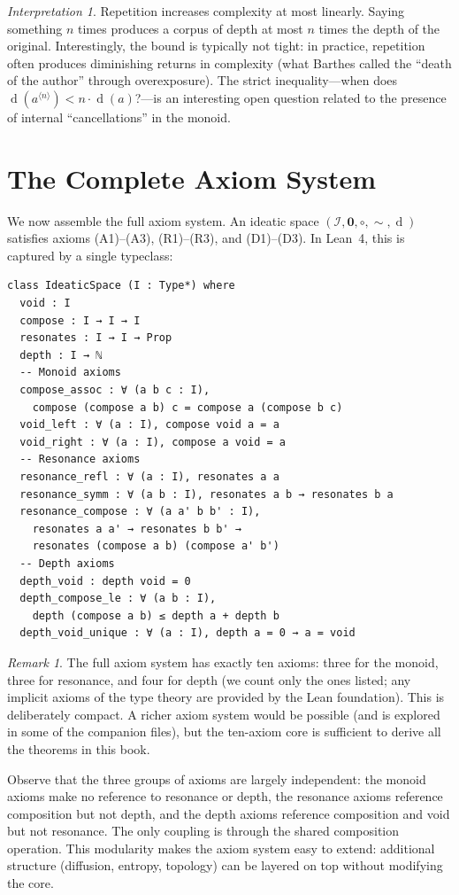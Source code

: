 \documentclass[11pt,openany]{book}
\theoremstyle{definition}
\theoremstyle{plain}
\theoremstyle{remark}
\newtheorem{remark}[axiom]{Remark}
\newtheorem{interpretation}[axiom]{Interpretation}
\newcommand{\IS}{\mathcal{I}}               %
\newcommand{\compose}{\circ}                 %
\newcommand{\void}{\mathbf{0}}              %
\newcommand{\res}{\sim}                      %
\newcommand{\depth}{\operatorname{d}}       %
\newcommand{\compN}[2]{#1^{\langle #2 \rangle}} %
\begin{document}
\begin{interpretation}
Repetition increases complexity at most linearly. Saying something $n$ times produces a corpus of depth at most $n$ times the depth of the original. Interestingly, the bound is typically not tight: in practice, repetition often produces diminishing returns in complexity (what Barthes called the ``death of the author'' through overexposure). The strict inequality---when does $\depth(\compN{a}{n}) < n \cdot \depth(a)$?---is an interesting open question related to the presence of internal ``cancellations'' in the monoid.
\end{interpretation}

\section{The Complete Axiom System}

We now assemble the full axiom system. An ideatic space $(\IS, \void, \compose, \res, \depth)$ satisfies axioms (A1)--(A3), (R1)--(R3), and (D1)--(D3). In Lean~4, this is captured by a single typeclass:

\begin{lstlisting}
class IdeaticSpace (I : Type*) where
  void : I
  compose : I → I → I
  resonates : I → I → Prop
  depth : I → ℕ
  -- Monoid axioms
  compose_assoc : ∀ (a b c : I), 
    compose (compose a b) c = compose a (compose b c)
  void_left : ∀ (a : I), compose void a = a
  void_right : ∀ (a : I), compose a void = a
  -- Resonance axioms
  resonance_refl : ∀ (a : I), resonates a a
  resonance_symm : ∀ (a b : I), resonates a b → resonates b a
  resonance_compose : ∀ (a a' b b' : I),
    resonates a a' → resonates b b' → 
    resonates (compose a b) (compose a' b')
  -- Depth axioms
  depth_void : depth void = 0
  depth_compose_le : ∀ (a b : I), 
    depth (compose a b) ≤ depth a + depth b
  depth_void_unique : ∀ (a : I), depth a = 0 → a = void
\end{lstlisting}

\begin{remark}
The full axiom system has exactly ten axioms: three for the monoid, three for resonance, and four for depth (we count only the ones listed; any implicit axioms of the type theory are provided by the Lean foundation). This is deliberately compact. A richer axiom system would be possible (and is explored in some of the companion files), but the ten-axiom core is sufficient to derive all the theorems in this book.

Observe that the three groups of axioms are largely independent: the monoid axioms make no reference to resonance or depth, the resonance axioms reference composition but not depth, and the depth axioms reference composition and void but not resonance. The only coupling is through the shared composition operation. This modularity makes the axiom system easy to extend: additional structure (diffusion, entropy, topology) can be layered on top without modifying the core.
\end{remark}
\end{document}
